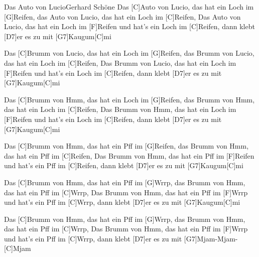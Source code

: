 \documentclass[../main.tex]{subfiles}
\begin{document}
\begin{song}{Das Auto von Lucio}{Gerhard Schöne}{}
Das [C]Auto von Lucio, das hat ein Loch im [G]Reifen, das Auto von Lucio, das hat ein Loch im [C]Reifen,
Das Auto von Lucio, das hat ein Loch im [F]Reifen und hat's ein Loch im [C]Reifen,
dann klebt [D7]er es zu mit [G7]Kaugum[C]mi

Das [C]Brumm von Lucio, das hat ein Loch im [G]Reifen, das Brumm von Lucio, das hat ein Loch im [C]Reifen,
Das Brumm von Lucio, das hat ein Loch im [F]Reifen und hat's ein Loch im [C]Reifen,
dann klebt [D7]er es zu mit [G7]Kaugum[C]mi

Das [C]Brumm von Hmm, das hat ein Loch im [G]Reifen, das Brumm von Hmm, das hat ein Loch im [C]Reifen,
Das Brumm von Hmm, das hat ein Loch im [F]Reifen und hat's ein Loch im [C]Reifen,
dann klebt [D7]er es zu mit [G7]Kaugum[C]mi

Das [C]Brumm von Hmm, das hat ein Pff im [G]Reifen, das Brumm von Hmm, das hat ein Pff im [C]Reifen,
Das Brumm von Hmm, das hat ein Pff im [F]Reifen und hat's ein Pff im [C]Reifen,
dann klebt [D7]er es zu mit [G7]Kaugum[C]mi

Das [C]Brumm von Hmm, das hat ein Pff im [G]Wrrp, das Brumm von Hmm, das hat ein Pff im [C]Wrrp,
Das Brumm von Hmm, das hat ein Pff im [F]Wrrp und hat's ein Pff im [C]Wrrp,
dann klebt [D7]er es zu mit [G7]Kaugum[C]mi

Das [C]Brumm von Hmm, das hat ein Pff im [G]Wrrp, das Brumm von Hmm, das hat ein Pff im [C]Wrrp,
Das Brumm von Hmm, das hat ein Pff im [F]Wrrp und hat's ein Pff im [C]Wrrp,
dann klebt [D7]er es zu mit [G7]Mjam-Mjam-[C]Mjam
\end{song}
\end{document}
